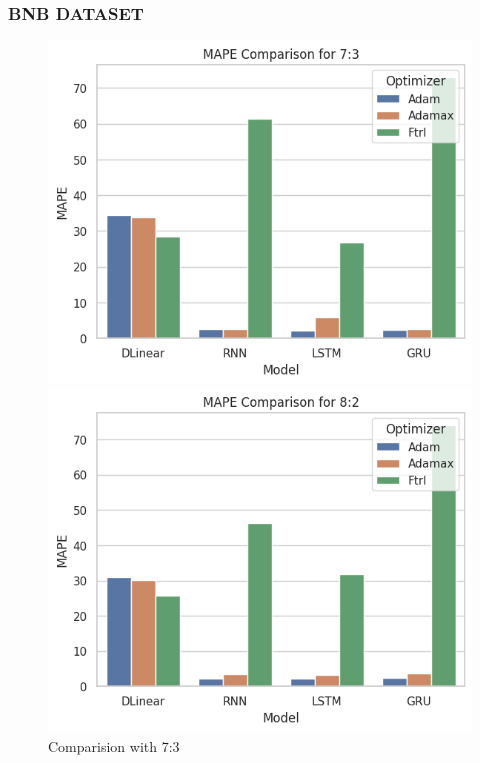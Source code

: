 \documentclass{ieeeojies}
\begin{document}
\subsubsection{BNB DATASET}


\begin{figure}[H]
    \centering
    \begin{minipage}{0.15\textwidth}
        \centering
        \includegraphics[width=1\textwidth]{image/MAPE_73_bnb.png}
        \caption{Comparision with 7:3}
        \label{fig:1}
    \end{minipage}%
    \hfill
    \begin{minipage}{0.15\textwidth}
        \centering
        \includegraphics[width=1\textwidth]{image/MAPE_82_bnb.png}

\end{minipage}
\end{figure}
\end{document}
